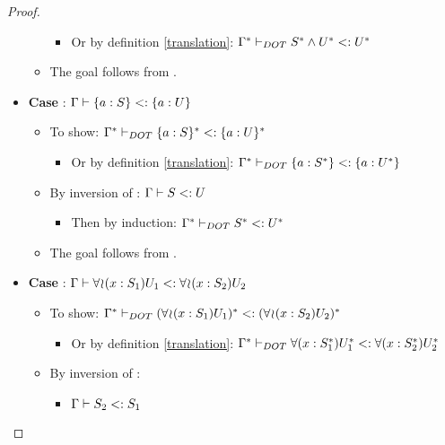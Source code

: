 \begin{proof}
\begin{itemize}
\begin{itemize}
\begin{itemize}
                \item Or by definition \ref{translation}: $\Gamma^{*} \vdash_{DOT} S^{*} \wedge U^{*} <: U^{*}$
            \end{itemize}
            \item The goal follows from .
        \end{itemize}
        \item \textbf{Case} :
            $\Gamma \vdash \{a : S\} <: \{a : U\}$
        \begin{itemize}
            \item To show:
                $\Gamma^{*} \vdash_{DOT} \{a : S\}^{*} <: \{a : U\}^{*}$
            \begin{itemize}
                \item Or by definition \ref{translation}:
                    $\Gamma^{*} \vdash_{DOT} \{a : S^{*}\} <: \{a : U^{*}\}$
            \end{itemize}
            \item By inversion of : $\Gamma \vdash S <: U$
            \begin{itemize}
                \item Then by induction:
                    $\Gamma^{*} \vdash_{DOT} S^{*} <: U^{*}$
            \end{itemize}
            \item The goal follows from .
        \end{itemize}
        \item \textbf{Case} :
            $\Gamma \vdash \forall\!\wr\!(x:S_1)U_1 <: \forall\!\wr\!(x:S_2)U_2$
        \begin{itemize}
            \item To show: $\Gamma^{*} \vdash_{DOT} (\forall\!\wr\!(x:S_1)U_1)^{*} <: (\forall\!\wr\!(x:S_2)U_2)^{*}$
            \begin{itemize}
                \item Or by definition \ref{translation}:
                    $\Gamma^{*} \vdash_{DOT} \forall(x:S_1^{*})U_1^{*} <: \forall(x:S_2^{*})U_2^{*}$
            \end{itemize}
            \item By inversion of :
            \begin{itemize}
                \item $\Gamma \vdash S_2 <: S_1$

\end{itemize}
\end{itemize}
\end{itemize}
\end{proof}
